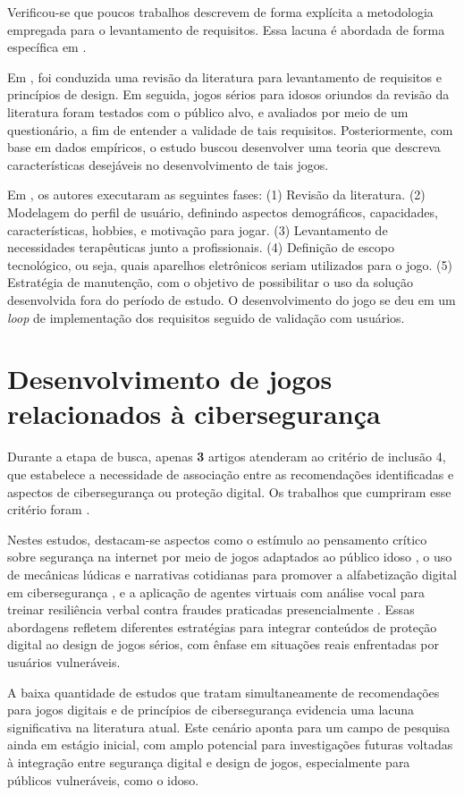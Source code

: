 Verificou-se que poucos trabalhos descrevem de forma explícita a metodologia empregada para o levantamento de requisitos. Essa lacuna é abordada de forma específica em \cite{machado2018heuristics, manser2021making}.

Em \cite{machado2018heuristics}, foi conduzida uma revisão da literatura para levantamento de requisitos e princípios de design. Em seguida, jogos sérios para idosos oriundos da revisão da literatura foram testados com o público alvo, e avaliados por meio de um questionário, a fim de entender a validade de tais requisitos. Posteriormente, com base em dados empíricos, o estudo buscou desenvolver uma teoria que descreva características desejáveis no desenvolvimento de tais jogos.

Em \cite{manser2021making}, os autores executaram as seguintes fases: (1) Revisão da literatura. (2) Modelagem do perfil de usuário, definindo aspectos demográficos, capacidades, características, hobbies, e motivação para jogar. (3) Levantamento de necessidades terapêuticas junto a profissionais. (4) Definição de escopo tecnológico, ou seja, quais aparelhos eletrônicos seriam utilizados para o jogo. (5) Estratégia de manutenção, com o objetivo de possibilitar o uso da solução desenvolvida fora do período de estudo. O desenvolvimento do jogo se deu em um \textit{loop} de implementação dos requisitos seguido de validação com usuários.

\section{Desenvolvimento de jogos relacionados à cibersegurança}\label{sec:ciberseguranca}

Durante a etapa de busca, apenas \textbf{3} artigos atenderam ao critério de inclusão 4, que estabelece a necessidade de associação entre as recomendações identificadas e aspectos de cibersegurança ou proteção digital. Os trabalhos que cumpriram esse critério foram \cite{machado2017learning, bernardino2021serious, van2020serious}.

Nestes estudos, destacam-se aspectos como o estímulo ao pensamento crítico sobre segurança na internet por meio de jogos adaptados ao público idoso \cite{machado2017learning}, o uso de mecânicas lúdicas e narrativas cotidianas para promover a alfabetização digital em cibersegurança \cite{bernardino2021serious}, e a aplicação de agentes virtuais com análise vocal para treinar resiliência verbal contra fraudes praticadas presencialmente \cite{van2020serious}. Essas abordagens refletem diferentes estratégias para integrar conteúdos de proteção digital ao design de jogos sérios, com ênfase em situações reais enfrentadas por usuários vulneráveis.

A baixa quantidade de estudos que tratam simultaneamente de recomendações para jogos digitais e de princípios de cibersegurança evidencia uma lacuna significativa na literatura atual. Este cenário aponta para um campo de pesquisa ainda em estágio inicial, com amplo potencial para investigações futuras voltadas à integração entre segurança digital e design de jogos, especialmente para públicos vulneráveis, como o idoso.
